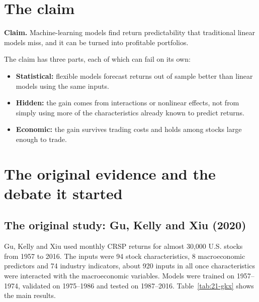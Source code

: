 \section{The claim}
\label{sec:21-claim}

\begin{callout}
\textbf{Claim.} Machine-learning models find return predictability that traditional linear models miss, and it can be turned into profitable portfolios.
\end{callout}

The claim has three parts, each of which can fail on its own:

\begin{itemize}
  \item \textbf{Statistical:} flexible models forecast returns out of sample better than linear models using the same inputs.
  \item \textbf{Hidden:} the gain comes from interactions or nonlinear effects, not from simply using more of the characteristics already known to predict returns.
  \item \textbf{Economic:} the gain survives trading costs and holds among stocks large enough to trade.
\end{itemize}


\section{The original evidence and the debate it started}
\label{sec:21-evidence}

\subsection{The original study: Gu, Kelly and Xiu (2020)}

Gu, Kelly and Xiu used monthly CRSP returns for almost 30,000 U.S. stocks from 1957 to 2016. The inputs were 94 stock characteristics, 8 macroeconomic predictors and 74 industry indicators, about 920 inputs in all once characteristics were interacted with the macroeconomic variables. Models were trained on 1957--1974, validated on 1975--1986 and tested on 1987--2016. Table~\ref{tab:21-gkx} shows the main results.

